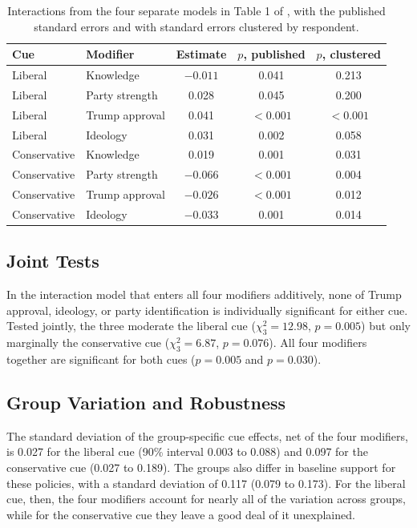 \documentclass[12pt]{article}
\begin{document}
\begin{table}[htpb]
\begin{center}
\begin{tabular}{llccc}
\hline
Cue & Modifier & Estimate & $p$, published & $p$, clustered \\
\hline
Liberal & Knowledge & $-0.011$ & 0.041 & 0.213 \\
Liberal & Party strength & 0.028 & 0.045 & 0.200 \\
Liberal & Trump approval & 0.041 & $<0.001$ & $<0.001$ \\
Liberal & Ideology & 0.031 & 0.002 & 0.058 \\
Conservative & Knowledge & 0.019 & 0.001 & 0.031 \\
Conservative & Party strength & $-0.066$ & $<0.001$ & 0.004 \\
Conservative & Trump approval & $-0.026$ & $<0.001$ & 0.012 \\
Conservative & Ideology & $-0.033$ & 0.001 & 0.014 \\
\hline
\end{tabular}
\caption{Interactions from the four separate models in Table 1 of \citet{BarberPope2019}, with the published standard errors and with standard errors clustered by respondent.}
\label{tab:bp-clustering}
\end{center}
\end{table}

\subsection{Joint Tests}

In the interaction model that enters all four modifiers additively, none of Trump approval, ideology, or party identification is individually significant for either cue.
Tested jointly, the three moderate the liberal cue ($\chi^2_3 = 12.98$, $p = 0.005$) but only marginally the conservative cue ($\chi^2_3 = 6.87$, $p = 0.076$).
All four modifiers together are significant for both cues ($p = 0.005$ and $p = 0.030$).


\subsection{Group Variation and Robustness}

The standard deviation of the group-specific cue effects, net of the four modifiers, is 0.027 for the liberal cue (90\% interval 0.003 to 0.088) and 0.097 for the conservative cue (0.027 to 0.189).
The groups also differ in baseline support for these policies, with a standard deviation of 0.117 (0.079 to 0.173).
For the liberal cue, then, the four modifiers account for nearly all of the variation across groups, while for the conservative cue they leave a good deal of it unexplained.
\end{document}
